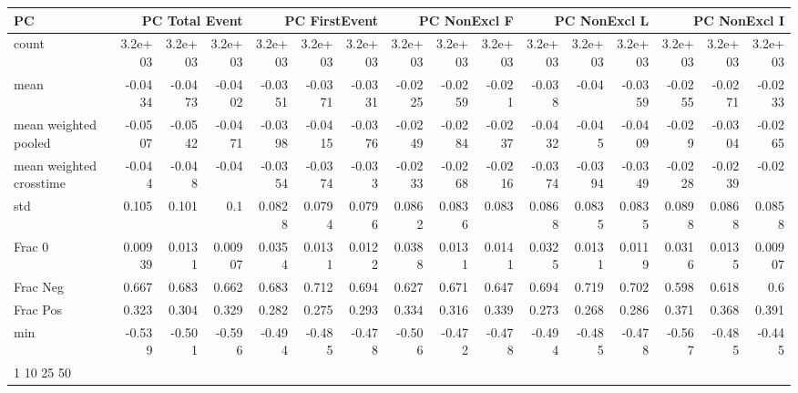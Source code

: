 \begin{tabular}{lrrrrrrrrrrrrrrr}
\toprule
PC & \multicolumn{3}{r}{PC Total Event} & \multicolumn{3}{r}{PC FirstEvent} & \multicolumn{3}{r}{PC NonExcl F} & \multicolumn{3}{r}{PC NonExcl L} & \multicolumn{3}{r}{PC NonExcl I} \\
\midrule
count & 3.2e+03 & 3.2e+03 & 3.2e+03 & 3.2e+03 & 3.2e+03 & 3.2e+03 & 3.2e+03 & 3.2e+03 & 3.2e+03 & 3.2e+03 & 3.2e+03 & 3.2e+03 & 3.2e+03 & 3.2e+03 & 3.2e+03 \\
mean & -0.0434 & -0.0473 & -0.0402 & -0.0351 & -0.0371 & -0.0331 & -0.0225 & -0.0259 & -0.021 & -0.038 & -0.04 & -0.0359 & -0.0255 & -0.0271 & -0.0233 \\
mean weighted pooled & -0.0507 & -0.0542 & -0.0471 & -0.0398 & -0.0415 & -0.0376 & -0.0249 & -0.0284 & -0.0237 & -0.0432 & -0.045 & -0.0409 & -0.029 & -0.0304 & -0.0265 \\
mean weighted crosstime & -0.044 & -0.048 & -0.04 & -0.0354 & -0.0374 & -0.033 & -0.0233 & -0.0268 & -0.0216 & -0.0374 & -0.0394 & -0.0349 & -0.0228 & -0.0239 & -0.02 \\
std & 0.105 & 0.101 & 0.1 & 0.0828 & 0.0794 & 0.0796 & 0.0862 & 0.0836 & 0.083 & 0.0868 & 0.0835 & 0.0835 & 0.0898 & 0.0868 & 0.0858 \\
Frac 0 & 0.00939 & 0.0131 & 0.00907 & 0.0354 & 0.0131 & 0.0122 & 0.0388 & 0.0131 & 0.0141 & 0.0325 & 0.0131 & 0.0119 & 0.0316 & 0.0135 & 0.00907 \\
Frac Neg & 0.667 & 0.683 & 0.662 & 0.683 & 0.712 & 0.694 & 0.627 & 0.671 & 0.647 & 0.694 & 0.719 & 0.702 & 0.598 & 0.618 & 0.6 \\
Frac Pos & 0.323 & 0.304 & 0.329 & 0.282 & 0.275 & 0.293 & 0.334 & 0.316 & 0.339 & 0.273 & 0.268 & 0.286 & 0.371 & 0.368 & 0.391 \\
min & -0.539 & -0.501 & -0.596 & -0.494 & -0.485 & -0.478 & -0.506 & -0.472 & -0.478 & -0.494 & -0.485 & -0.478 & -0.567 & -0.485 & -0.445 \\
1%
10%
25%
50%

\end{tabular}
